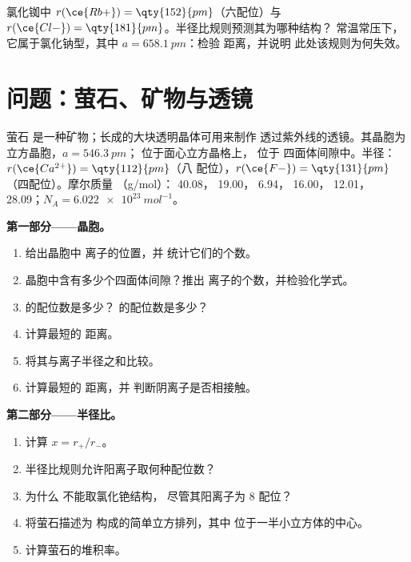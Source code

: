 \begin{exercise}[$\star\star\star$]\label{exo:b1:crystals-ionic-covalent:12}
氯化铷中 $r(\ce{Rb+}) = \qty{152}{pm}$（六配位）与
$r(\ce{Cl-}) = \qty{181}{pm}$。半径比规则预测其为哪种结构？
常温常压下，它属于氯化钠型，其中
$a = \qty{658.1}{pm}$：检验  距离，并说明
此处该规则为何失效。
\end{exercise}

\section{问题：萤石、矿物与透镜}

\begin{problem}
\label{pb:b1:crystals-ionic-covalent:1}
萤石  是一种矿物；长成的大块透明晶体可用来制作
透过紫外线的透镜。其晶胞为立方晶胞，$a =
\qty{546.3}{pm}$； 位于面心立方晶格上， 位于
四面体间隙中。半径：$r(\ce{Ca^{2+}}) = \qty{112}{pm}$（八
配位），$r(\ce{F-}) = \qty{131}{pm}$（四配位）。摩尔质量
（g/mol）： 40.08， 19.00， 6.94， 16.00，
12.01， 28.09；$N_A = \qty{6.022e23}{mol^{-1}}$。

\medskip
\noindent\textbf{第一部分——晶胞。}
\begin{enumerate}
  \item 给出晶胞中  离子的位置，并
        统计它们的个数。
  \item 晶胞中含有多少个四面体间隙？推出
         离子的个数，并检验化学式。
  \item {} 的配位数是多少？ 的配位数是多少？
  \item 计算最短的  距离。
  \item 将其与离子半径之和比较。
  \item 计算最短的  距离，并
        判断阴离子是否相接触。
\end{enumerate}

\medskip
\noindent\textbf{第二部分——半径比。}
\begin{enumerate}[resume]
  \item 计算 $x = r_+/r_-$。
  \item 半径比规则允许阳离子取何种配位数？
  \item 为什么  不能取氯化铯结构，
        尽管其阳离子为 8 配位？
  \item 将萤石描述为  构成的简单立方排列，其中
         位于一半小立方体的中心。
  \item 计算萤石的堆积率。
\end{enumerate}


\end{problem}
